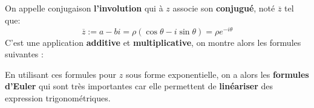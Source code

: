 \subsection*{}
On appelle conjugaison \textbf{l'involution} qui à \(z\) associe son \textbf{conjugué}, noté \(\overline{z}\) tel que:
\[
    \overline{z} := a - bi = \rho(\cos\theta - i\sin\theta) = \rho e^{-i\theta}
\]
C'est une application \textbf{additive} et \textbf{multiplicative}, on montre alors les formules suivantes {:}

En utilisant ces formules pour \(z\) sous forme exponentielle, on a alors les \textbf{formules d'Euler} qui sont très importantes car elle permettent de \textbf{linéariser} des expression trigonométriques.\<

